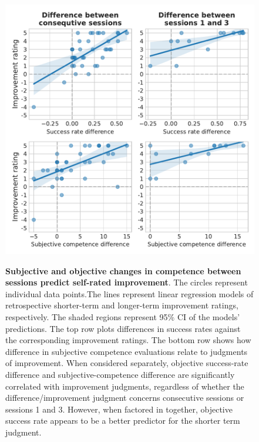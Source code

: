 \begin{figure}[h!]
    \centering
    {\includegraphics[width=.9\linewidth]{Figures/c5/jolds_vs_subjective_objective_competence.pdf}}
    \caption[short figure description]{\textbf{Subjective and objective changes in competence between sessions predict self-rated improvement}. The circles represent individual data points.The lines represent linear regression models of retrospective shorter-term and longer-term improvement ratings, respectively. The shaded regions represent 95\% CI of the models' predictions. The top row plots differences in success rates against the corresponding improvement ratings. The bottom row shows how difference in subjective competence evaluations relate to judgments of improvement. When considered separately, objective success-rate difference and subjective-competence difference are significantly correlated with improvement judgments, regardless of whether the difference/improvement judgment concerns consecutive sessions or sessions 1 and 3. However, when factored in together, objective success rate appears to be a better predictor for the shorter term judgment.}\label{fig:5-jolds_vs_subjective_objective_competence}
\end{figure}


